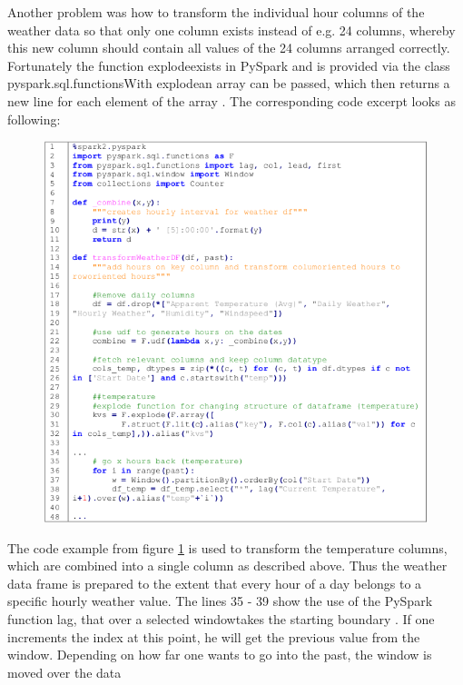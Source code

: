 Another problem was how to transform the individual hour columns of the weather data so that
only one column exists instead of e.g. 24 columns, whereby this new column should contain all
values of the 24 columns arranged correctly. Fortunately the function \glqq explode\grqq exists in PySpark
and is provided via the class \glqq pyspark.sql.functions\grqq  With \glqq explode\grqq an array can be passed,
which then returns a new line for each element of the array \cite{RN8}. The corresponding code excerpt
looks as following:
\begin{figure}[H]
\hspace{-1.6cm}
\includegraphics[width=1.2\textwidth]{img/listing7}\label{fig:listing7}
\label{fig:listing7}
\end{figure}
The code example from figure \ref{fig:listing7} is used to transform the temperature columns, which are
combined into a single column as described above. Thus the weather data frame is prepared to
the extent that every hour of a day belongs to a specific hourly weather value. The lines 35 - 39 show the use of the PySpark function \glqq lag\grqq ,  that over a selected \glqq window\grqq takes the starting
boundary \cite{RN8}. If one increments the index at this point, he will get the previous value from the
window. Depending on how far one wants to go into the past, the window is moved over the data
